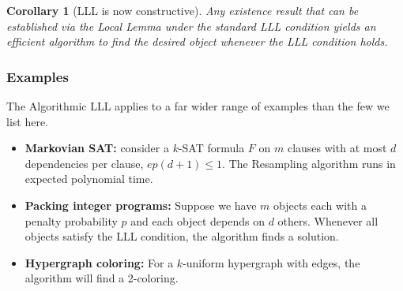 \documentclass[twoside,12pt]{book}
\theoremstyle{plain}
\newtheorem{corollary}[theorem]{Corollary}
\theoremstyle{definition}
\theoremstyle{remark}
\begin{document}
\begin{corollary}[LLL is now constructive]
\label{cor:Moser-Tardos-constructive}
Any existence result that can be established via the Local Lemma under
the standard LLL condition yields an efficient algorithm to find the
desired object whenever the LLL condition holds.
\end{corollary}

\subsubsection*{Examples}
The Algorithmic LLL applies to a far wider range of examples than the
few we list here.

\begin{itemize}
\item {\bf Markovian SAT:} consider a $k$-SAT formula $F$ on $m$ clauses
with at most $d$ dependencies per clause, $e p (d+1) \le 1$.
The Resampling algorithm runs in expected polynomial time.

\item {\bf Packing integer programs:} Suppose we have $m$ objects each with a
penalty probability $p$ and each object depends on $d$ others. Whenever all
objects satisfy the LLL condition, the algorithm finds a solution.

\item {\bf Hypergraph coloring:} For a $k$-uniform hypergraph with edges, the algorithm will find a 2-coloring.

\end{itemize}
\end{document}
